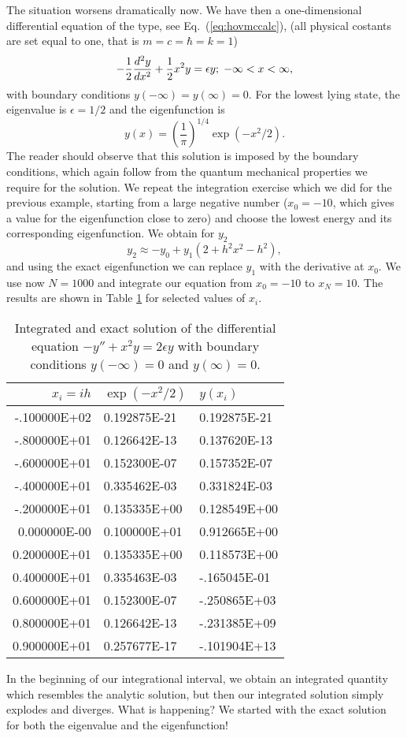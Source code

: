 The situation worsens dramatically now.
We have then a one-dimensional differential equation of the type, see Eq.~(\ref{eq:hovmccalc}),
(all physical costants are set equal to one, that is $m=c=\hbar=k=1$)
\[
   -\frac{1}{2}\frac{d^2y}{dx^2}+\frac{1}{2}x^2y=\epsilon y; \hspace{0.1cm} -\infty < x < \infty ,
\]
with boundary conditions $y(-\infty)=y(\infty)=0$. 
For the lowest lying state, the eigenvalue is $\epsilon=1/2$ and the eigenfunction is
\[
   y(x) = \left(\frac{1}{\pi}\right)^{1/4} \exp{(-x^2/2)}.
\]
The reader should observe that this solution is imposed by the boundary
conditions, which again follow from the quantum mechanical properties we require for
the solution. 
We repeat the integration exercise which we did for the previous example, starting from
a large negative number ($x_0=-10$, which gives a value for the eigenfunction close to zero) 
and choose the lowest energy and its corresponding eigenfunction.
We obtain for $y_2$
\[
     y_{2}\approx -y_{0}+y_1\left(2+h^2x^2-h^2\right),
\]  
and using the exact eigenfunction we can replace $y_1$ with the derivative at $x_0$.
We use now $N=1000$ and integrate our equation from $x_0=-10$ to $x_N=10$. The results are shown in
Table \ref{tab:numdiff2} for selected values of $x_i$.
\begin{table}[t]
\begin{center}
\caption{Integrated and exact solution of the differential equation $-y''+x^2y=2\epsilon y$ 
with boundary conditions $y(-\infty) =0$ and $y(\infty) = 0$. \label{tab:numdiff2}} 
\begin{tabular}{rll}\hline
$x_i=ih$&$\exp{(-x^2/2)}$&$y(x_i)$\\\hline
-.100000E+02 &0.192875E-21 &0.192875E-21\\
-.800000E+01 &0.126642E-13 &0.137620E-13\\
-.600000E+01 &0.152300E-07 &0.157352E-07\\
-.400000E+01 &0.335462E-03 &0.331824E-03\\
-.200000E+01 &0.135335E+00 &0.128549E+00\\
0.000000E-00 &0.100000E+01 &0.912665E+00\\
0.200000E+01 &0.135335E+00 &0.118573E+00\\
0.400000E+01 &0.335463E-03 &-.165045E-01\\
0.600000E+01 &0.152300E-07 &-.250865E+03\\
0.800000E+01 &0.126642E-13 &-.231385E+09\\
0.900000E+01 &0.257677E-17 &-.101904E+13\\
\hline
\end{tabular} 
\end{center}   
\end{table}     
In the beginning of our integrational interval, we obtain an integrated quantity which resembles
the analytic solution, but then our integrated solution simply explodes and diverges.
What is happening? We started with the exact solution for both the eigenvalue and the eigenfunction! 

